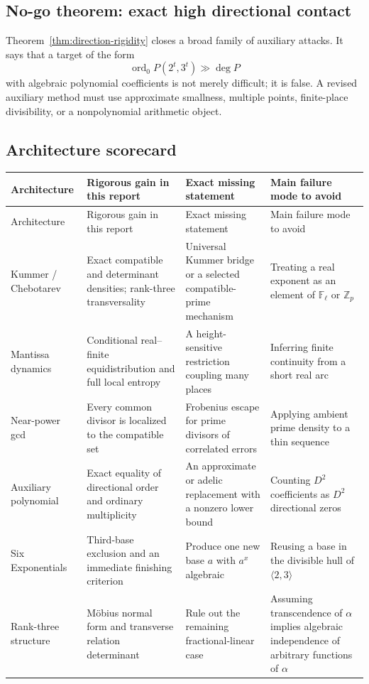 \documentclass[11pt,oneside]{article}
\theoremstyle{definition}
\theoremstyle{remark}
\newcommand{\Z}{\mathbb{Z}}
\newcommand{\F}{\mathbb{F}}
\newcommand{\ord}{\operatorname{ord}}
\begin{document}
\subsection{No-go theorem: exact high directional contact}

Theorem~\ref{thm:direction-rigidity} closes a broad family of auxiliary
attacks.  It says that a target of the form
\[
 \ord_0 P(2^t,3^t)\gg\deg P
\]
with algebraic polynomial coefficients is not merely difficult; it is
false.  A revised auxiliary method must use approximate smallness, multiple
points, finite-place divisibility, or a nonpolynomial arithmetic object.

\subsection{Architecture scorecard}

\begin{longtable}{@{}p{}p{}p{}p{}@{}}
\toprule
Architecture & Rigorous gain in this report & Exact missing statement & Main failure mode to avoid\\
\midrule
\endfirsthead
\toprule
Architecture & Rigorous gain in this report & Exact missing statement & Main failure mode to avoid\\
\midrule
\endhead
Kummer / Chebotarev & Exact compatible and determinant densities; rank-three transversality & Universal Kummer bridge or a selected compatible-prime mechanism & Treating a real exponent as an element of $\F_\ell$ or $\Z_p$\\
\addlinespace
Mantissa dynamics & Conditional real--finite equidistribution and full local entropy & A height-sensitive restriction coupling many places & Inferring finite continuity from a short real arc\\
\addlinespace
Near-power gcd & Every common divisor is localized to the compatible set & Frobenius escape for prime divisors of correlated errors & Applying ambient prime density to a thin sequence\\
\addlinespace
Auxiliary polynomial & Exact equality of directional order and ordinary multiplicity & An approximate or adelic replacement with a nonzero lower bound & Counting $D^2$ coefficients as $D^2$ directional zeros\\
\addlinespace
Six Exponentials & Third-base exclusion and an immediate finishing criterion & Produce one new base $a$ with $a^x$ algebraic & Reusing a base in the divisible hull of $\langle2,3\rangle$\\
\addlinespace
Rank-three structure & Möbius normal form and transverse relation determinant & Rule out the remaining fractional-linear case & Assuming transcendence of $\alpha$ implies algebraic independence of arbitrary functions of $\alpha$\\
\bottomrule
\end{longtable}
\end{document}
